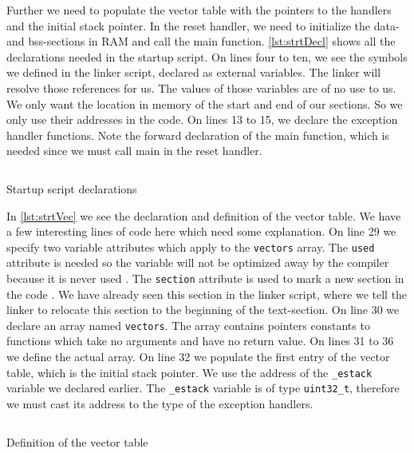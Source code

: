 \documentclass[a4paper,12pt]{article}
\newcommand{\inlinec}[1]{\texttt{#1}}
\begin{document}
Further we need to populate the vector table with the pointers to the handlers and the initial stack pointer. In the reset handler, we need to initialize the data- and bss-sections in \ac{RAM} and call the main function. \autoref{lst:strtDecl} shows all the declarations needed in the startup script. On lines four to ten, we see the symbols we defined in the linker script, declared as external variables. The linker will resolve those references for us. The values of those variables are of no use to us. We only want the location in memory of the start and end of our sections. So we only use their addresses in the code. On lines 13 to 15, we declare the exception handler functions. Note the forward declaration of the main function, which is needed since we must call main in the reset handler.

\begin{listing}
  \inputminted[firstline=3, lastline=18]{c}{../code/nrf52840-from-scratch/nrf52840_startup.c}
  \caption{Startup script declarations}
  \label{lst:strtDecl}
\end{listing}

\newpage
In \autoref{lst:strtVec} we see the declaration and definition of the vector table. We have a few interesting lines of code here which need some explanation. On line 29 we specify two variable attributes which apply to the \inlinec{vectors} array. The \inlinec{used} attribute is needed so the variable will not be optimized away by the compiler because it is never used \cite{ArmDeveloperDocCompSpecFeat}. The \inlinec{section} attribute is used to mark a new section in the code \cite{ArmDeveloperDocCompSpecFeat}. We have already seen this section in the linker script, where we tell the linker to relocate this section to the beginning of the text-section. On line 30 we declare an array named \inlinec{vectors}. The array contains pointers constants to functions which take no arguments and have no return value. On lines 31 to 36 we define the actual array. On line 32 we populate the first entry of the vector table, which is the initial stack pointer. We use the address of the \inlinec{_estack} variable we declared earlier. The \inlinec{_estack} variable is of type \inlinec{uint32_t}, therefore we must cast its address to the type of the exception handlers.

\begin{listing}
  \inputminted[firstline=29, lastline=36]{c}{../code/nrf52840-from-scratch/nrf52840_startup.c}
  \caption{Definition of the vector table}
  \label{lst:strtVec}
\end{listing}
\end{document}
